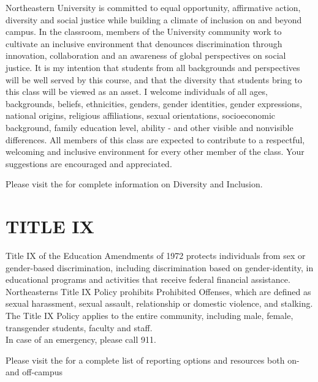 \documentclass[letterpaper]{inzane_syllabus} %
\begin{document}
Northeastern University is committed to equal opportunity, affirmative action, diversity and social justice while building a climate of inclusion on and beyond campus.  In the classroom, members of the University community work to cultivate an inclusive environment that denounces discrimination through innovation, collaboration and an awareness of global perspectives on social justice. It is my intention that students from all backgrounds and perspectives will be well served by this course, and that the diversity that students bring to this class will be viewed as an asset. I welcome individuals of all ages, backgrounds, beliefs, ethnicities, genders, gender identities, gender expressions, national origins, religious affiliations, sexual orientations, socioeconomic background, family education level, ability - and other visible and nonvisible differences. All members of this class are expected to contribute to a respectful, welcoming and inclusive environment for every other member of the class. Your suggestions are encouraged and appreciated.

Please visit the \href{http://www.northeastern.edu/oidi/}{} for complete information on Diversity and Inclusion.

\vspace{0.1cm}
\section{TITLE IX}
\vspace{0.05cm}

Title IX of the Education Amendments of 1972 protects individuals from sex or gender-based discrimination, including discrimination based on gender-identity, in educational programs and activities that receive federal financial assistance.\\
Northeastern\textquotesingle s Title IX Policy prohibits Prohibited Offenses, which are defined as sexual harassment, sexual assault, relationship or domestic violence, and stalking. The Title IX Policy applies to the entire community, including male, female, transgender students, faculty and staff.\\
In case of an emergency, please call 911.

Please visit the \href{http://www.northeastern.edu/titleix}{} for a complete list of reporting options and resources both on- and off-campus
\end{document}
